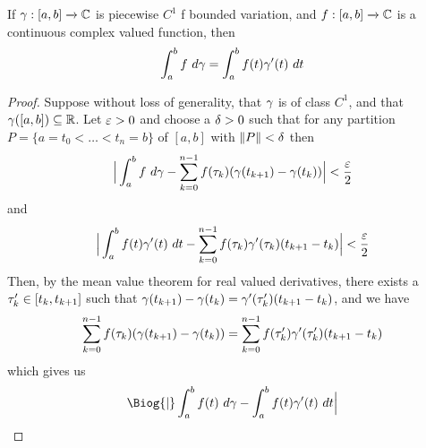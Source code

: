 \begin{theorem}\label{4.1.9}
    If $\gamma:[a,b] \xrightarrow{} \mathbb{C}$ is piecewise $C^1$ f bounded variation, and
     $f:[a,b] \xrightarrow{} \mathbb{C}$ is a continuous complex valued function, then
     \begin{equation*}
         \int_a^b{f \ d\y}=\int_a^b{f(t)\y'(t) \ dt}
     \end{equation*}
\end{theorem}
\begin{proof}
    Suppose without loss of generality, that $\gamma$ is of class  $C^1$, and that
    $\gamma([a,b]) \subseteq \mathbb{R}$. Let $\varepsilon>0$ and choose a  $\delta>0$ such that for any
    partition  $P=\{a=t_0<\dots<t_n=b\}$ of $[a,b]$ with $\|P\|<\delta$ then
    \begin{equation*}
        \Big{|} \int_a^b{f \ d\y}-\sum_{k=0}^{n-1}{f(\t_k)(\y(t_{k+1})-\y(t_k))} \Big{|}
        < \frac{\e}{2}
    \end{equation*}
    and
    \begin{equation*}
        \Big{|} \int_a^b{f(t)\gamma'(t) \ dt}-
        \sum_{k=0}^{n-1}{f(\tau_k)\gamma'(\tau_k)(t_{k+1}-t_k)} \Big{|} < \frac{\varepsilon}{2}
    \end{equation*}
    Then, by the mean value theorem for real valued derivatives, there exists a
    $\tau'_k \in [t_k,t_{k+1}]$ such that
    $\gamma(t_{k+1})-\gamma(t_k)=\gamma'(\tau'_k)(t_{k+1}-t_k)$, and we have
    \begin{equation*}
        \sum_{k=0}^{n-1}{f(\tau_k)(\gamma(t_{k+1})-\gamma(t_k))}=
        \sum_{k=0}^{n-1}{f(\tau'_k)\gamma'(\tau'_k)(t_{k+1}-t_k)}
    \end{equation*}
    which gives us
    \begin{equation*}
        \Biog{|} \int_a^b{f(t) \ d\y}-\int_a^b{f(t)\y'(t) \ dt} \Big{|}
    \end{equation*}
\end{proof}
